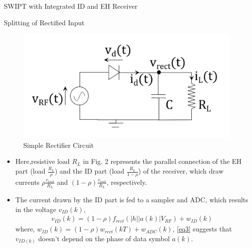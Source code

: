 \documentclass{beamer}
\begin{document}
\begin{section}{SWIPT with Integrated ID and EH Receiver}
\begin{subsection}{Splitting of Rectified Input}
\begin{frame}{}
\begin{itemize}
    \begin{figure}[t]
        \centering
         \includegraphics[scale=0.2]{Images/Picture3.jpeg}
         \caption{Simple Rectifier Circuit}
        \label{fig:my_label3}
        \end{figure}
        \end{itemize}
\end{frame}
\begin{frame}
  \begin{itemize}
  
    \item Here,resistive load $R_L$ in Fig. 2 represents the parallel connection of the EH part (load $\frac{R_L}{\rho}$) and the ID part (load $\frac{R_{L}}{1 - \rho }$) of the receiver, which draw currents $\rho \frac{v_{rect}}{R_L}$ and $(1 - \rho ) \frac{v_{rect}}{R_L} $, respectively.
  
        \item The current drawn by the ID part is fed to a sampler and ADC, which results in the voltage $v_{ID}(k)$,
        \begin{align}
            v_{ID}(k)=(1 - \rho )f_{rect}(|h||a(k)|V_{RF})+w_{ID}(k)
            \label{eq3}
        \end{align}
        where, $w_{ID}(k)=(1 - \rho )w_{rect}(kT)+w_{ADC}(k)$, \eqref{eq3} suggests that $v_{ID(k)}$ doesn't depend on the phase of data symbol $a(k)$.
    \end{itemize}
\end{frame}
\end{subsection}
\end{section}
\end{document}
